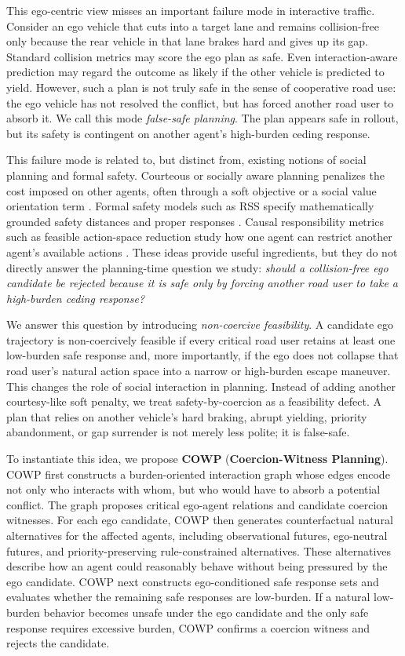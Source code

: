 \documentclass[10pt]{article}
\begin{document}
This ego-centric view misses an important failure mode in interactive traffic. Consider an ego vehicle that cuts into a target lane and remains collision-free only because the rear vehicle in that lane brakes hard and gives up its gap. Standard collision metrics may score the ego plan as safe. Even interaction-aware prediction may regard the outcome as likely if the other vehicle is predicted to yield. However, such a plan is not truly safe in the sense of cooperative road use: the ego vehicle has not resolved the conflict, but has forced another road user to absorb it. We call this mode \emph{false-safe planning}. The plan appears safe in rollout, but its safety is contingent on another agent's high-burden ceding response. 

This failure mode is related to, but distinct from, existing notions of social planning and formal safety. Courteous or socially aware planning penalizes the cost imposed on other agents, often through a soft objective or a social value orientation term \cite{sun2018courteous, schwarting2019social, crosato2022svo}. Formal safety models such as RSS specify mathematically grounded safety distances and proper responses \cite{shalev2017rss}. Causal responsibility metrics such as feasible action-space reduction study how one agent can restrict another agent's available actions \cite{george2023fear}. These ideas provide useful ingredients, but they do not directly answer the planning-time question we study: \emph{should a collision-free ego candidate be rejected because it is safe only by forcing another road user to take a high-burden ceding response?} 

We answer this question by introducing \emph{non-coercive feasibility}. A candidate ego trajectory is non-coercively feasible if every critical road user retains at least one low-burden safe response and, more importantly, if the ego does not collapse that road user's natural action space into a narrow or high-burden escape maneuver. This changes the role of social interaction in planning. Instead of adding another courtesy-like soft penalty, we treat safety-by-coercion as a feasibility defect. A plan that relies on another vehicle's hard braking, abrupt yielding, priority abandonment, or gap surrender is not merely less polite; it is false-safe. 

To instantiate this idea, we propose \textbf{COWP} (\textbf{Coercion-Witness Planning}). COWP first constructs a burden-oriented interaction graph whose edges encode not only who interacts with whom, but who would have to absorb a potential conflict. The graph proposes critical ego-agent relations and candidate coercion witnesses. For each ego candidate, COWP then generates counterfactual natural alternatives for the affected agents, including observational futures, ego-neutral futures, and priority-preserving rule-constrained alternatives. These alternatives describe how an agent could reasonably behave without being pressured by the ego candidate. COWP next constructs ego-conditioned safe response sets and evaluates whether the remaining safe responses are low-burden. If a natural low-burden behavior becomes unsafe under the ego candidate and the only safe response requires excessive burden, COWP confirms a coercion witness and rejects the candidate. 
\end{document}
